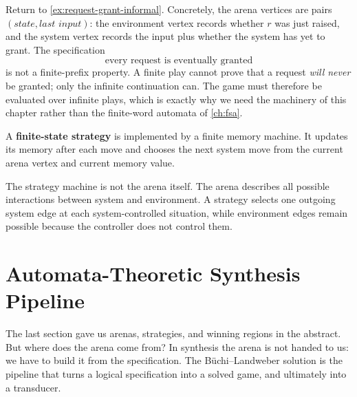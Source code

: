 \begin{example}
\label{ex:request-grant-game}
Return to \cref{ex:request-grant-informal}.  Concretely, the arena
vertices are pairs $(\textit{state},\textit{last input})$: the
environment vertex records whether $r$ was just raised, and the system
vertex records the input plus whether the system has yet to grant.  The
specification
\[
  \text{every request is eventually granted}
\]
is not a finite-prefix property.  A finite play cannot prove that a
request \emph{will never} be granted; only the infinite continuation
can.  The game must therefore be evaluated over infinite plays, which is
exactly why we need the machinery of this chapter rather than the
finite-word automata of \cref{ch:fsa}.
\end{example}

\begin{definition}
\label{def:finite-state-strategy}
A \textbf{finite-state strategy} is implemented by a finite memory
machine.  It updates its memory after each move and chooses the next
system move from the current arena vertex and current memory value.
\end{definition}

The strategy machine is not the arena itself.  The arena describes all
possible interactions between system and environment.  A strategy
selects one outgoing system edge at each system-controlled situation,
while environment edges remain possible because the controller does not
control them.


\section{Automata-Theoretic Synthesis Pipeline}
\label{sec:synthesis-pipeline}

The last section gave us arenas, strategies, and winning regions in the
abstract.  But where does the arena come from?  In synthesis the arena
is not handed to us: we have to build it from the specification.  The
B\"uchi--Landweber solution is the pipeline that turns a logical
specification into a solved game, and ultimately into a transducer.

